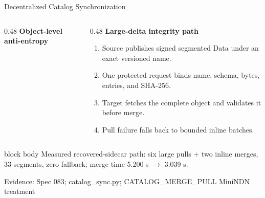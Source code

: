 \documentclass[aspectratio=169]{beamer}
\newcommand{\bluebox}[1]{%
  \begin{beamercolorbox}[rounded=true,shadow=false,sep=0.65em,wd=\linewidth]{block body}
  #1
  \end{beamercolorbox}
}
\newcommand{\evidence}[1]{%
  \vfill\par\noindent
  {\color{SoftGray}\tiny Evidence: #1}\par
}
\begin{document}
\begin{frame}{Decentralized Catalog Synchronization}
\footnotesize
\begin{columns}[T]
\begin{column}{0.48\textwidth}
\textbf{Object-level anti-entropy}
\begin{center}
\end{center}
\end{column}
\begin{column}{0.48\textwidth}
\textbf{Large-delta integrity path}
\begin{enumerate}
  \item Source publishes signed segmented Data under an exact versioned name.
  \item One protected request binds name, schema, bytes, entries, and SHA-256.
  \item Target fetches the complete object and validates it before merge.
  \item Pull failure falls back to bounded inline batches.
\end{enumerate}
\end{column}
\end{columns}

\vspace{0.3em}
\bluebox{Measured recovered-sidecar path: six large pulls + two inline merges, 33 segments, zero fallback; merge time 5.200 s $\to$ 3.039 s.}
\evidence{Spec 083; catalog\_sync.py; CATALOG\_MERGE\_PULL MiniNDN treatment}
\end{frame}
\end{document}
